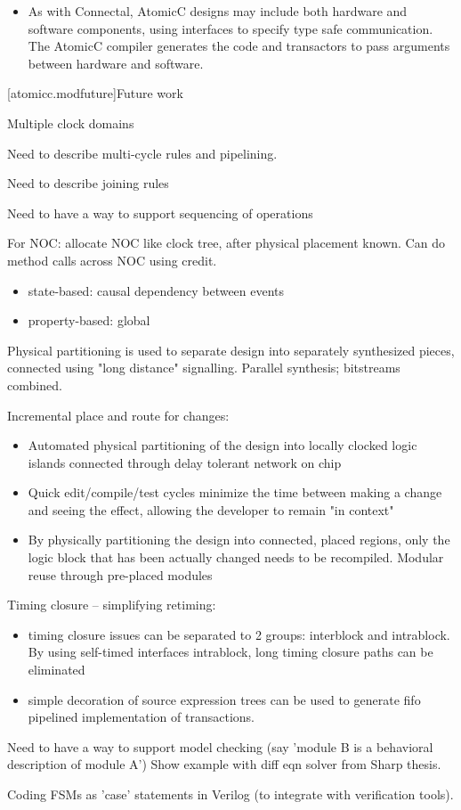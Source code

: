 \begin{itemize}
\item As with Connectal\cite{king2015software}, AtomicC designs may include both hardware and
software components, using interfaces to specify type safe communication.
The AtomicC compiler generates the code and transactors to pass
arguments between hardware and software.

\end{itemize}

[atomicc.modfuture]{Future work}

Multiple clock domains

Need to describe multi-cycle rules and pipelining.

Need to describe joining rules

Need to have a way to support sequencing of operations

For NOC: allocate NOC like clock tree, after physical placement known.  Can do 
method calls across NOC using credit.

\begin{itemize}
\item state-based: causal dependency between events
\item property-based: global
\end{itemize}

Physical partitioning is used to separate design into separately synthesized pieces, connected using
"long distance" signalling.  Parallel synthesis; bitstreams combined.

Incremental place and route for changes:
\begin{itemize}
\item Automated physical partitioning of the design into locally clocked logic islands
connected through delay tolerant network on chip
\item Quick edit/compile/test cycles minimize the time between making a change and
seeing the effect, allowing the developer to remain "in context"
\item By physically partitioning the design into connected, placed regions, only the
logic block that has been actually changed needs to be recompiled.  Modular reuse through pre-placed modules
\end{itemize}

Timing closure -- simplifying retiming:
\begin{itemize}
\item timing closure issues
can be separated to 2 groups: interblock and intrablock.
By using self-timed interfaces intrablock, long timing closure paths can be eliminated
\item simple decoration of source expression trees can be used to generate
fifo pipelined implementation of transactions.
\end{itemize}

Need to have a way to support model checking (say 'module B is a behavioral description of module A')
Show example with diff eqn solver from Sharp thesis.

Coding FSMs as 'case' statements in Verilog (to integrate with verification tools).

